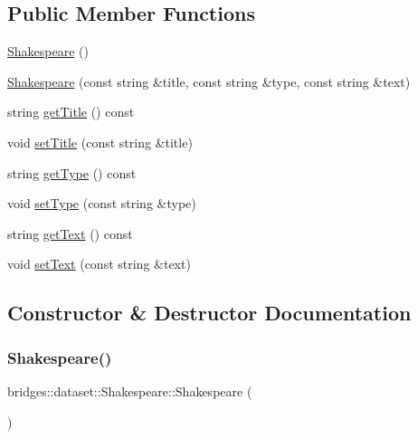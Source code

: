 \subsection*{Public Member Functions}
\begin{DoxyCompactItemize}
\item 
\mbox{\hyperlink{classbridges_1_1dataset_1_1_shakespeare_a58ff458b70e8198b2e235eacd17be91c}{Shakespeare}} ()
\item 
\mbox{\hyperlink{classbridges_1_1dataset_1_1_shakespeare_a859f3625fb8019967aa8083f20993cad}{Shakespeare}} (const string \&title, const string \&type, const string \&text)
\item 
string \mbox{\hyperlink{classbridges_1_1dataset_1_1_shakespeare_a00ff743145899bf88435b194b6291ce7}{get\+Title}} () const
\item 
void \mbox{\hyperlink{classbridges_1_1dataset_1_1_shakespeare_a92c11a229b38913fea73cfe26474587b}{set\+Title}} (const string \&title)
\item 
string \mbox{\hyperlink{classbridges_1_1dataset_1_1_shakespeare_af0cc6fd91d90e663d343c52756e9f191}{get\+Type}} () const
\item 
void \mbox{\hyperlink{classbridges_1_1dataset_1_1_shakespeare_a4e9d1126524d2b10f5fe36ffd4588f15}{set\+Type}} (const string \&type)
\item 
string \mbox{\hyperlink{classbridges_1_1dataset_1_1_shakespeare_a23de5e2229cc15bb1c9f1eacaee007ee}{get\+Text}} () const
\item 
void \mbox{\hyperlink{classbridges_1_1dataset_1_1_shakespeare_af285363fb2bfe9cf302786ae31d4cc8c}{set\+Text}} (const string \&text)
\end{DoxyCompactItemize}


\subsection{Constructor \& Destructor Documentation}
\mbox{\label{classbridges_1_1dataset_1_1_shakespeare_a58ff458b70e8198b2e235eacd17be91c}} 
\subsubsection{\texorpdfstring{Shakespeare()}{Shakespeare()}\hspace{0.1cm}{\footnotesize\ttfamily [1/2]}}
{\footnotesize\ttfamily bridges\+::dataset\+::\+Shakespeare\+::\+Shakespeare (\begin{DoxyParamCaption}{ }\end{DoxyParamCaption})\hspace{0.3cm}{\ttfamily [inline]}}


